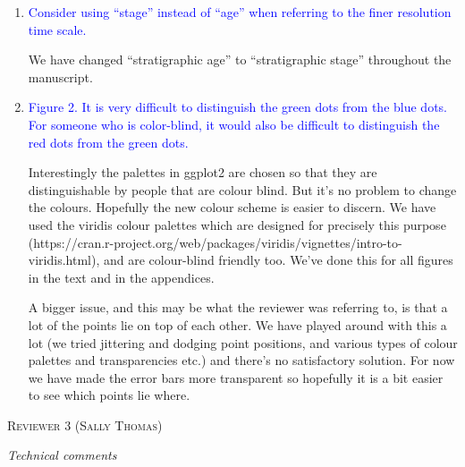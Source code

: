 \documentclass[12pt,letterpaper]{article}
\renewcommand{\section}[1]{%
\bigskip
\begin{center}
\begin{Large}
\normalfont\scshape #1
\medskip
\end{Large}
\end{center}}
\renewcommand{\subsection}[1]{%
\bigskip
\begin{center}
\begin{large}
\normalfont\itshape #1
\end{large}
\end{center}}
\begin{document}
\begin{enumerate}
\item{\textcolor{blue}{Consider using ``stage'' instead of ``age'' when referring to the finer resolution time scale.}}

We have changed ``stratigraphic age'' to ``stratigraphic stage'' throughout the manuscript.

\item{\textcolor{blue}{Figure 2. It is very difficult to distinguish the green dots from the blue dots. For someone who is color-blind, it would also be difficult to distinguish the red dots from the green dots.}}


Interestingly the palettes in ggplot2 are chosen so that they are distinguishable by people that are colour blind. But it's no problem to change the colours. Hopefully the new colour scheme is easier to discern. We have used the viridis colour palettes which are designed for precisely this purpose (https://cran.r-project.org/web/packages/viridis/vignettes/intro-to-viridis.html), and are colour-blind friendly too. We've done this for all figures in the text and in the appendices.

A bigger issue, and this may be what the reviewer was referring to, is that a lot of the points lie on top of each other. We have played around with this a lot (we tried jittering and dodging point positions, and various types of colour palettes and transparencies etc.) and there's no satisfactory solution. For now we have made the error bars more transparent so hopefully it is a bit easier to see which points lie where.


\end{enumerate}


%
%


\section{Reviewer 3 (Sally Thomas)}
\subsection{Technical comments}
\end{document}

